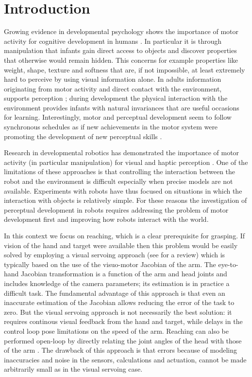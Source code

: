 \section{Introduction}
Growing evidence in developmental psychology shows the importance 
of motor activity for cognitive development in humans \cite{gallese06mirror}. 
In particular it is through manipulation that infants gain direct access 
to objects and discover properties that otherwise would remain hidden. 
This concerns for example properties like weight, shape, texture and 
softness that are, if not impossible, at least extremely hard to perceive 
by using visual information alone. In adults information originating 
from motor activity and direct contact with the environment, supports 
perception \cite{klatzky87hand}; during development
the physical interaction with the environment provides infants 
with natural invariances that are useful occasions for learning.
Interestingly, motor and perceptual development seem to follow synchronous  
schedules as if new achievements in the motor system were promoting
the development of new perceptual skills \cite{bushnell93motor}.

Research in developmental robotics has demonstrated the importance of
motor activity (in particular manipulation) for visual and haptic 
perception \cite{fitzpatrick07shared}. One of the 
limitations of these approaches is that controlling the interaction between
the robot and the environment is difficult especially when precise models are
not available. Experiments with robots have thus focused on situations
in which the interaction with objects is relatively simple. For these reasons
the investigation of perceptual development in robots requires addressing 
the problem of motor development first and improving how robots interact
with the world.

In this context we focus on reaching, which is a clear prerequisite for 
grasping. If vision of the hand and target were available then this problem 
would be easily solved by employing a visual servoing approach (see 
\cite{hutchinson96tutorial} for a review) which is typically based on 
the use of the visuo-motor Jacobian of the arm. The eye-to-hand Jacobian 
transformation is a function of the arm and head joints and includes knowledge 
of the camera parameters; its estimation is in practice a difficult task.
The fundamental advantage of this approach is that even an inaccurate 
estimation 
of the Jacobian allows reducing the error of the task to zero. But the visual 
servoing approach is not necessarily the best solution: it requires continous 
visual feedback from the hand and target, while delays in the control loop 
pose limitations on the speed of the arm.
Reaching can also be performed open-loop by directly relating the joint angles 
of the head with those of the arm 
\cite{blackburn94learning,metta99developmental}. 
The drawback of this approach is that errors because of modeling inaccuracies 
and noise in the sensors, calculations and actuation, cannot be made 
arbitrarily small as in the visual servoing case.

